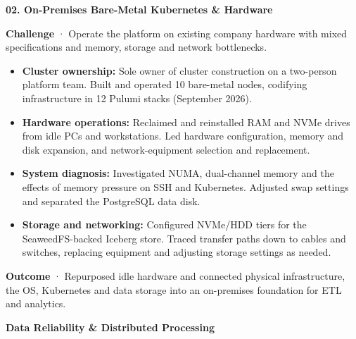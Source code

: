 \documentclass[a4paper,10pt]{article}
\newcommand{\project}[2]{\vspace{5pt}\textbf{\color{accent}#1}\hfill{\small\color{muted}#2}\par}
\begin{document}
\project{02. On-Premises Bare-Metal Kubernetes \& Hardware}{}
\textbf{Challenge} · Operate the platform on existing company hardware with mixed specifications and memory, storage and network bottlenecks.
\begin{itemize}
\item \textbf{Cluster ownership:} Sole owner of cluster construction on a two-person platform team. Built and operated 10 bare-metal nodes, codifying infrastructure in 12 Pulumi stacks (September 2026).
\item \textbf{Hardware operations:} Reclaimed and reinstalled RAM and NVMe drives from idle PCs and workstations. Led hardware configuration, memory and disk expansion, and network-equipment selection and replacement.
\item \textbf{System diagnosis:} Investigated NUMA, dual-channel memory and the effects of memory pressure on SSH and Kubernetes. Adjusted swap settings and separated the PostgreSQL data disk.
\item \textbf{Storage and networking:} Configured NVMe/HDD tiers for the SeaweedFS-backed Iceberg store. Traced transfer paths down to cables and switches, replacing equipment and adjusting storage settings as needed.
\end{itemize}
\textbf{Outcome} · Repurposed idle hardware and connected physical infrastructure, the OS, Kubernetes and data storage into an on-premises foundation for ETL and analytics.

\newpage
{\fontsize{21}{27}\selectfont\bfseries\color{accent}Data Reliability \& Distributed Processing}\par
\end{document}
